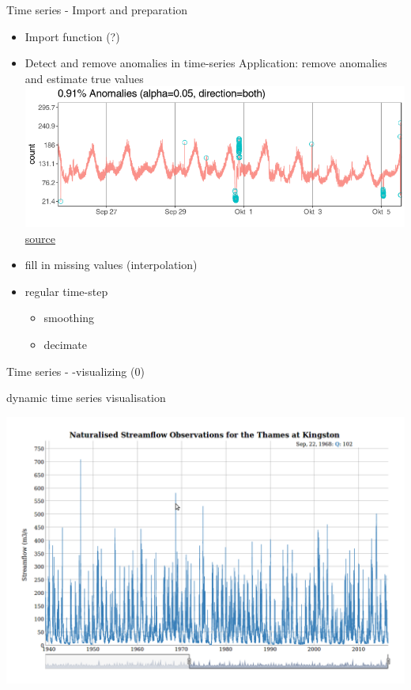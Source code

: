 \documentclass[9pt,ignorenonframetext,]{beamer}
\providecommand{\tightlist}{%
  \setlength{\itemsep}{0pt}\setlength{\parskip}{0pt}}
\begin{document}
\begin{frame}{Time series - Import and preparation}

\begin{itemize}
\tightlist
\item
  Import function (?)
\item
  Detect and remove anomalies in time-series Application: remove
  anomalies and estimate true values
  \includegraphics{imgPres/TS_anomalydetection.png}
  \href{https://github.com/twitter/AnomalyDetection}{source}
\item
  fill in missing values (interpolation)
\item
  regular time-step

  \begin{itemize}
  \tightlist
  \item
    smoothing
  \item
    decimate
  \end{itemize}
\end{itemize}

\end{frame}

\begin{frame}{Time series - -visualizing (0)}

dynamic time series visualisation

\includegraphics{imgPres/dygraph.png}

\end{frame}
\end{document}
